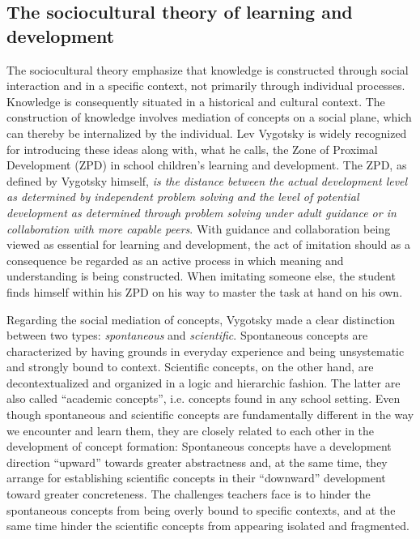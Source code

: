 \documentclass[aps,prb,floatfix,twocolumn,twoside,english]{revtex4-1}
\begin{document}
\subsection{The sociocultural theory of learning and development}

The sociocultural theory emphasize that knowledge is constructed through social interaction and in a specific context, not primarily through individual processes. Knowledge is consequently situated in a historical and cultural context. The construction of knowledge involves mediation of concepts on a social plane, which can thereby be internalized by the individual.\cite{Wertsch:1985} Lev Vygotsky is widely recognized for introducing these ideas along with, what he calls, the Zone of Proximal Development (ZPD) in school children's learning and development.\cite{Vygotsky:1978} The ZPD, as defined by Vygotsky himself, \textit{is the distance between the actual development level as determined by independent problem solving and the level of potential development as determined through problem solving under adult guidance or in collaboration with more capable peers}. With guidance and collaboration being viewed as essential for learning and development, the act of imitation should as a consequence be regarded as an active process in which meaning and understanding is being constructed. When imitating someone else, the student finds himself within his ZPD on his way to master the task at hand on his own.

Regarding the social mediation of concepts, Vygotsky made a clear distinction between two types: \textit{spontaneous} and \textit{scientific}.\cite{Vygotsky:1986} Spontaneous concepts are characterized by having grounds in everyday experience and being unsystematic and strongly bound to context. Scientific concepts, on the other hand, are decontextualized and organized in a logic and hierarchic fashion. The latter are also called ``academic concepts'', i.e. concepts found in any school setting. Even though spontaneous and scientific concepts are fundamentally different in the way we encounter and learn them, they are closely related to each other in the development of concept formation: Spontaneous concepts have a development direction ``upward'' towards greater abstractness and, at the same time, they arrange for establishing scientific concepts in their ``downward'' development toward greater concreteness. The challenges teachers face is to hinder the spontaneous concepts from being overly bound to specific contexts, and at the same time hinder the scientific concepts from appearing isolated and fragmented.
\end{document}
